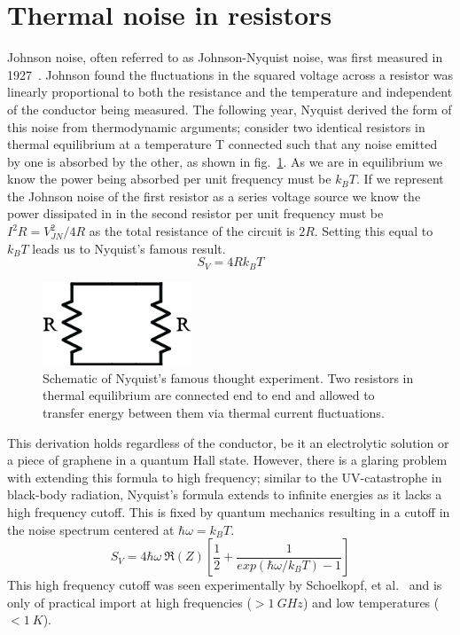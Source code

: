 \section{Thermal noise in resistors}
Johnson noise, often referred to as Johnson-Nyquist noise, was first measured in 1927~\cite{johnson_thermal_1927}. Johnson found the fluctuations in the squared voltage across a resistor was linearly proportional to both the resistance and the temperature and independent of the conductor being measured. The following year, Nyquist derived the form of this noise from thermodynamic arguments; consider two identical resistors in thermal equilibrium at a temperature T connected such that any noise emitted by one is absorbed by the other, as shown in fig.~\ref{fig:Nyquist_resistors}. As we are in equilibrium we know the power being absorbed per unit frequency must be $k_BT$. If we represent the Johnson noise of the first resistor as a series voltage source we know the power dissipated in in the second resistor per unit frequency must be $I^2R = V_{JN}^2 / 4R$ as the total resistance of the circuit is $2R$. Setting this equal to $k_BT$ leads us to Nyquist's famous result.
\begin{equation}\label{eq:Nyquist}
S_{V} = 4Rk_BT
\end{equation}
\begin{figure}
\centering
\includegraphics[height = 25mm]{figures/Johnson_noise_thermometry/Nyquist_resistors.png}
\caption{Schematic of Nyquist's famous thought experiment. Two resistors in thermal equilibrium are connected end to end and allowed to transfer energy between them via thermal current fluctuations.}
\label{fig:Nyquist_resistors}
\end{figure}
This derivation holds regardless of the conductor, be it an electrolytic solution or a piece of graphene in a quantum Hall state. However, there is a glaring problem with extending this formula to high frequency; similar to the UV-catastrophe in black-body radiation, Nyquist's formula extends to infinite energies as it lacks a high frequency cutoff. This is fixed by quantum mechanics resulting in a cutoff in the noise spectrum centered at $\hbar\omega = k_BT$.
\begin{equation}\label{eq:NyquistFull}
S_V = 4\hbar\omega~\Re(Z)\left[\frac{1}{2}+\frac{1}{exp(\hbar\omega/k_BT)-1}\right]
\end{equation}
This high frequency cutoff was seen experimentally by Schoelkopf, et al.~\cite{schoelkopf_frequency_1997} and is only of practical import at high frequencies ($>1~GHz$) and low temperatures ($<1~K$).

